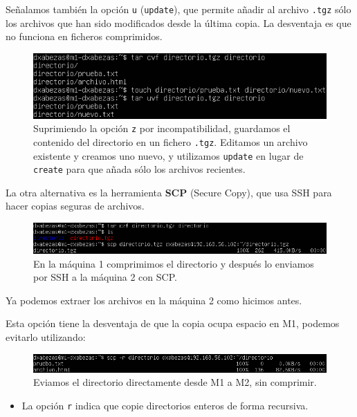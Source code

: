 \documentclass{article}
\begin{document}
Señalamos también la opción \texttt{u} (\texttt{update}), que permite añadir al archivo \texttt{.tgz} sólo los archivos que han sido
 modificados desde la última copia. La desventaja es que no funciona en ficheros comprimidos.

\begin{figure}[H]
	\centering
	\includegraphics[width=140mm]{imgs/tar-update}
	\caption{Suprimiendo la opción \texttt{z} por incompatibilidad, guardamos el contenido del directorio en un fichero \texttt{.tgz}.
	Editamos un archivo existente y creamos uno nuevo, y utilizamos \texttt{update} en lugar de \texttt{create} para que añada sólo los
	archivos recientes.}
	\label{fig:tar-update}
\end{figure}

La otra alternativa es la herramienta \textbf{SCP} (Secure Copy), que usa SSH para hacer copias seguras de archivos.

\begin{figure}[H]
	\centering
	\includegraphics[width=160mm]{imgs/scp}
	\caption{En la máquina 1 comprimimos el directorio y después lo enviamos por SSH a la máquina 2 con SCP.}
	\label{fig:scp}
\end{figure}

Ya podemos extraer los archivos en la máquina 2 como hicimos antes.

Esta opción tiene la desventaja de que la copia ocupa espacio en M1, podemos evitarlo utilizando:

\begin{figure}[H]
	\centering
	\includegraphics[width=160mm]{imgs/scp2}
	\caption{Eviamos el directorio directamente desde M1 a M2, sin comprimir.}
	\label{fig:scp2}
\end{figure}

\begin{itemize}
	\item La opción \texttt{r} indica que copie directorios enteros de forma recursiva.
\end{itemize}
\end{document}
